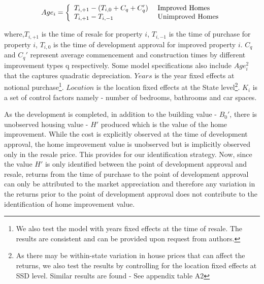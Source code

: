 \documentclass[AEJ,reqno, draftmode]{AEA} %
\begin{document}
\begin{equation}
    Age_i = \left\{
    \begin{array}{l l}
      T_{i,+1}-(T_{i,0} + C_q + C_q') & \text{ Improved Homes}\\
      T_{i,+1}-T_{i,-1}  & \text{ Unimproved Homes} \\
    \end{array} \right.
\end{equation}

where,$T_{i,+1}$ is the time of resale for property $i$, $T_{i,-1}$ is the time of purchase for property $i$, $T_{i,0}$ is the time of development approval for improved property $i$. $C_q$ and $C_q'$ represent average commencement and construction times by different improvement types q respectively. Some model specifications also include $Age_i^2$ that the captures quadratic depreciation. $Years$ is the year fixed effects at notional purchase\footnote{We also test the model with years fixed effects at the time of resale. The results are consistent and can be provided upon request from authors.}. $Location$ is the location fixed effects at the State level\footnote{As there may be within-state variation in house prices that can affect the returns, we also test the results by controlling for the location fixed effects at SSD level. Similar results are found - See appendix table A2}. $K_i$ is a set of control factors namely - number of bedrooms, bathrooms and car spaces.


As the development is completed, in addition to the building value - $B_0'$, there is unobserved housing value - $H'$ produced which is the value of the home improvement. While the cost is explicitly observed at the time of development approval, the home improvement value is unobserved but is implicitly observed only in the resale price. This provides for our identification strategy. Now, since the value $H'$ is only identified between the point of development approval and resale, returns from the time of purchase to the point of development approval can only be attributed to the market appreciation and therefore any variation in the returns prior to the point of development approval does not contribute to the identification of home improvement value. 
\end{document}

